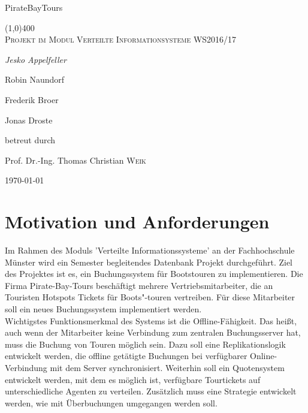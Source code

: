 \documentclass[12pt,a4paper,ngerman,english]{report}
\newenvironment{abstractpage}
{\cleardoublepage\vspace*{\fill}\thispagestyle{empty}}
{\vfill\cleardoublepage}
\newenvironment{abstrac}[1]
{\bigskip\selectlanguage{#1}%
	\begin{center}\bfseries\abstractname\end{center}}
{\par\bigskip}
\begin{document}
\begin{titlepage}
\begin{center}	
	\Huge{PirateBayTours}
	
	\line(1,0){400} \\
	\textsc{\Large Projekt im Modul Verteilte Informationsysteme WS2016/17}\\
	[10cm]

	{\Large\itshape Jesko Appelfeller \par Robin Naundorf \par Frederik Broer \par Jonas Droste \par  }
	\vfill

	\large{betreut durch\par
		Prof. Dr.-Ing. Thomas Christian \textsc{Weik}}

	\vfill
	{\large \today\par}

\end{center}
\end{titlepage}


\newpage
\begin{abstractpage}
	\begin{abstrac}{ngerman}
	\end{abstrac}
\end{abstractpage}



\newpage
\tableofcontents

\chapter{Motivation und Anforderungen}
Im Rahmen des Moduls 'Verteilte Informationssysteme' an der Fachhochschule Münster wird ein Semester begleitendes Datenbank Projekt durchgeführt. Ziel des Projektes ist es, ein Buchungssystem für Bootstouren zu implementieren. Die Firma Pirate-Bay-Tours beschäftigt mehrere Vertriebsmitarbeiter, die an Touristen Hotspots Tickets für Boots"-touren vertreiben. Für diese Mitarbeiter soll ein neues Buchungssystem implementiert werden.\\
Wichtigstes Funktionsmerkmal des Systems ist die Offline-Fähigkeit. Das heißt, auch wenn der Mitarbeiter keine Verbindung zum zentralen Buchungsserver hat, muss die Buchung von Touren möglich sein. Dazu soll eine Replikationslogik entwickelt werden, die offline getätigte Buchungen bei verfügbarer Online-Verbindung mit dem Server synchronisiert. Weiterhin soll ein Quotensystem entwickelt werden, mit dem es möglich ist, verfügbare Tourtickets auf unterschiedliche Agenten zu verteilen. Zusätzlich muss eine Strategie entwickelt werden, wie mit Überbuchungen umgegangen werden soll.
\end{document}
